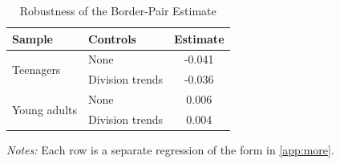 \documentclass[11pt]{article}
\begin{document}
\begin{table}[h]
\centering
\caption{Robustness of the Border-Pair Estimate}
\label{tab:robust}
\begin{tabular}{llc}
\toprule
Sample & Controls & Estimate \\
\midrule
\multirow{2}{*}{Teenagers} & None & -0.041 \\
 & Division trends & -0.036 \\
\multirow{2}{*}{Young adults} & None & 0.006 \\
 & Division trends & 0.004 \\
\bottomrule
\end{tabular}

\parbox{0.8\textwidth}{\footnotesize \textit{Notes:} Each row is a separate regression of the form in \cref{app:more}.}
\end{table}
\end{document}
